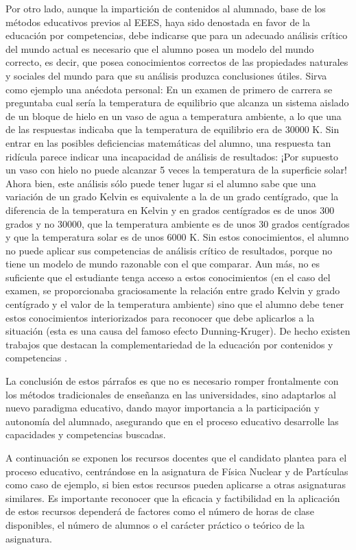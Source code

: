 \documentclass[a4paper,12pt,twoside]{article}
\begin{document}
Por otro lado, aunque la impartición de contenidos al alumnado, base de los métodos educativos previos al EEES, haya sido denostada en favor de la educación por competencias, debe indicarse que para un adecuado análisis crítico del mundo actual es necesario que el alumno posea un modelo del mundo correcto, es decir, que posea conocimientos correctos de las propiedades naturales y sociales del mundo para que su análisis produzca conclusiones útiles. Sirva como ejemplo una anécdota personal: En un examen de primero de carrera se preguntaba cual sería la temperatura de equilibrio que alcanza un sistema aislado de un bloque de hielo en un vaso de agua a temperatura ambiente, a lo que una de las respuestas indicaba que la temperatura de equilibrio era de 30000 K. Sin entrar en las posibles deficiencias matemáticas del alumno, una respuesta tan ridícula parece indicar una incapacidad de análisis de resultados: ¡Por supuesto un vaso con hielo no puede alcanzar 5 veces la temperatura de la superficie solar! Ahora bien, este análisis sólo puede tener lugar si el alumno sabe que una variación de un grado Kelvin es equivalente a la de un grado centígrado, que la diferencia de la temperatura en Kelvin y en grados centígrados es de unos 300 grados y no 30000, que la temperatura ambiente es de unos 30 grados centígrados y que la temperatura solar es de unos 6000 K. Sin estos conocimientos, el alumno no puede aplicar sus competencias de análisis crítico de resultados, porque no tiene un modelo de mundo razonable con el que comparar. Aun más, no es suficiente que el estudiante tenga acceso a estos conocimientos (en el caso del examen, se proporcionaba graciosamente la relación entre grado Kelvin y grado centígrado y el valor de la temperatura ambiente) sino que el alumno debe tener estos conocimientos interiorizados para reconocer que debe aplicarlos a la situación (esta es una causa del famoso efecto Dunning-Kruger). De hecho existen trabajos que destacan la complementariedad de la educación por contenidos y competencias \cite{Angulo11}.

La conclusión de estos párrafos es que no es necesario romper frontalmente con los métodos tradicionales de enseñanza en las universidades, sino adaptarlos al nuevo paradigma educativo, dando mayor importancia a la participación y autonomía del alumnado, asegurando que en el proceso educativo desarrolle las capacidades y competencias buscadas.

A continuación se exponen los recursos docentes que el candidato plantea para el proceso educativo, centrándose en la asignatura de Física Nuclear y de Partículas como caso de ejemplo, si bien estos recursos pueden aplicarse a otras asignaturas similares. Es importante reconocer que la eficacia y factibilidad en la aplicación de estos recursos dependerá de factores como el número de horas de clase disponibles, el número de alumnos o el carácter práctico o teórico de la asignatura.
\end{document}
